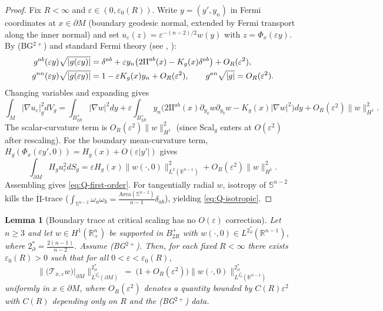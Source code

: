 \documentclass[11pt,reqno,a4paper]{amsart}
\newcommand{\R}{\mathbb{R}}
\numberwithin{equation}{section}
\theoremstyle{plain}
\newtheorem{lemma}[theorem]{Lemma}
\newcommand{\Scal}{\mathrm{Scal}}
\theoremstyle{remark}
\theoremstyle{plain}
\begin{document}
\begin{proof}
Fix $R<\infty$ and $\varepsilon\in(0,\varepsilon_0(R))$. Write $y=(y',y_n)$ in Fermi coordinates at $x\in\partial M$
(boundary geodesic normal, extended by Fermi transport along the inner normal) and set
$u_\varepsilon(z)=\varepsilon^{-(n-2)/2}w(y)$ with $z=\Phi_x(\varepsilon y)$.
By \textup{(BG$^{2+}$)} and standard Fermi theory
(see \cite[\S2]{EscobarJDG92}, \cite[Ch.~2]{Aubin98}):
\begin{align}
g^{ab}(\varepsilon y)\sqrt{|g(\varepsilon y)|}
&=\delta^{ab}+\varepsilon y_n\big(2\mathrm{II}^{ab}(x)-K_g(x)\delta^{ab}\big)+O_R(\varepsilon^2),
\label{eq:F2}\\
g^{nn}(\varepsilon y)\sqrt{|g(\varepsilon y)|}
&=1-\varepsilon K_g(x)y_n+O_R(\varepsilon^2),\qquad g^{an}\sqrt{|g|}=O_R(\varepsilon^2).
\notag
\end{align}
Changing variables and expanding gives
\begin{equation}\label{eq:E2}
\int_M |\nabla u_\varepsilon|_g^2dV_g
=\int_{B^+_{2R}}|\nabla w|^2dy + \varepsilon\int_{B^+_{2R}} y_n\big(2\mathrm{II}^{ab}(x)\partial_{y_a}w\partial_{y_b}w - K_g(x)|\nabla w|^2\big)dy
+O_R(\varepsilon^2)\|w\|_{H^1}^2.
\end{equation}
The scalar-curvature term is $O_R(\varepsilon^2)\|w\|_{H^1}^2$ (since $\Scal_g$ enters at $O(\varepsilon^2)$ after rescaling).
For the boundary mean-curvature term, $H_g(\Phi_x(\varepsilon y',0))=H_g(x)+O(\varepsilon|y'|)$ gives
\begin{equation}\label{eq:E4}
\int_{\partial M} H_gu_\varepsilon^2dS_g
=\varepsilon H_g(x)\|w(\cdot,0)\|_{L^2(\R^{n-1})}^2+O_R(\varepsilon^2)\|w\|_{H^1}^2.
\end{equation}
Assembling gives \eqref{eq:Q-first-order}.
For tangentially radial $w$, isotropy of $\mathbb S^{n-2}$ kills the $\mathring{\mathrm{II}}$-trace
($\int_{\mathbb S^{n-2}}\omega_a\omega_b=\frac{\mathrm{Area}(\mathbb S^{n-2})}{n-1}\delta_{ab}$),
yielding \eqref{eq:Q-isotropic}.
\end{proof}


\begin{lemma}[Boundary trace at critical scaling has no $O(\varepsilon)$ correction]\label{lem:trace-no-linear}
Let $n\ge 3$ and let $w\in H^1(\R^n_+)$ be supported in $B_{2R}^+$ with
$w(\cdot,0)\in L^{2^*_{\partial}}(\R^{n-1})$, where $2^*_{\partial}=\frac{2(n-1)}{n-2}$.
Assume \textup{(BG$^{2+}$)}. Then, for each fixed $R<\infty$ there exists
$\varepsilon_0(R)>0$ such that for all $0<\varepsilon<\varepsilon_0(R)$,
\[
\big\|\big(\mathcal T_{x,\varepsilon}w\big)\big|_{\partial M}\big\|_{L^{2^*_{\partial}}(\partial M)}^{2^*_{\partial}}
\ =\ \big(1+O_R(\varepsilon^2)\big)\|w(\cdot,0)\|_{L^{2^*_{\partial}}(\R^{n-1})}^{2^*_{\partial}}
\]
uniformly in $x\in\partial M$, where $O_R(\varepsilon^2)$ denotes a quantity bounded by
$C(R)\varepsilon^2$ with $C(R)$ depending only on $R$ and the \textup{(BG$^{2+}$)} data.
\end{lemma}
\end{document}
